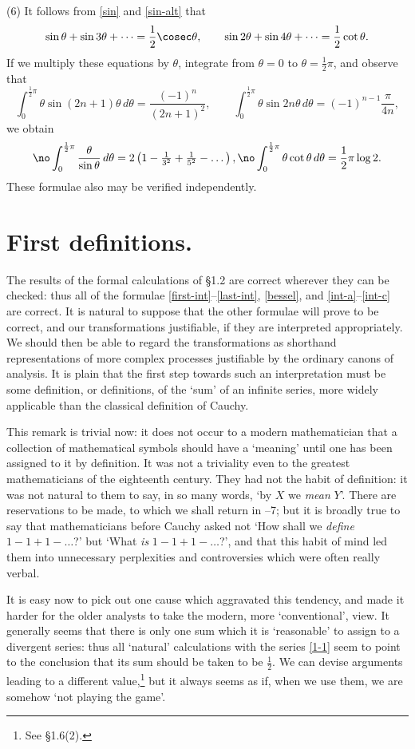 (6) It follows from \eqref{sin} and \eqref{sin-alt} that
$$\sin\theta+\sin3\theta+\dots = \frac12\cosec\theta, \qquad \sin2\theta+\sin4\theta+\dots = \frac12\cot\theta.$$
If we multiply these equations by $\theta$, integrate from $\theta=0$ to
$\theta=\frac12\pi$, and observe that
$$\int_0^{\frac12\pi} \theta\sin(2n+1)\theta\,d\theta = \frac{(-1)^n}{(2n+1)^2}, \qquad \int_0^{\frac12\pi} \theta\sin2n\theta\,d\theta = (-1)^{n-1}\frac{\pi}{4n},$$
we obtain
$$\no\label{int-b} \int_0^{\frac12\pi} \frac{\theta}{\sin\theta}\,d\theta = 2\left(1-\tfrac1{3^2}+\tfrac1{5^2}-\dots\right), \\
  \no\label{int-c} \int_0^{\frac12\pi} \theta\cot\theta\,d\theta = \frac12\pi\log2.$$
These formulae also may be verified independently.

\section{First definitions.} The results of the formal calculations of
\S1.2 are correct wherever they can be checked: thus all of the formulae
\eqref{first-int}--\eqref{last-int}, \eqref{bessel}, and
\eqref{int-a}--\eqref{int-c} are correct. It is natural to suppose that the
other formulae will prove to be correct, and our transformations
justifiable, if they are interpreted appropriately. We should then be able
to regard the transformations as shorthand representations of more complex
processes justifiable by the ordinary canons of analysis. It is plain that
the first step towards such an interpretation must be some definition, or
definitions, of the `sum' of an infinite series, more widely applicable than
the classical definition of Cauchy.

This remark is trivial now: it does not occur to a modern mathematician
that a collection of mathematical symbols should have a `meaning' until one
has been assigned to it by definition. It was not a triviality even to the
greatest mathematicians of the eighteenth century. They had not the habit of
definition: it was not natural to them to say, in so many words, `by $X$ we
\emph{mean} $Y$'. There are reservations to be made, to which we shall
return in --7; but it is broadly true to say that mathematicians
before Cauchy asked not `How shall we \emph{define} $1-1+1-\dots$?' but
`What \emph{is} $1-1+1-\dots$?', and that this habit of mind led them into
unnecessary perplexities and controversies which were often really verbal.

It is easy now to pick out one cause which aggravated this tendency, and
made it harder for the older analysts to take the modern, more
`conventional', view. It generally seems that there is only one sum which it
is `reasonable' to assign to a divergent series: thus all `natural'
calculations with the series \eqref{1-1} seem to point to the conclusion
that its sum should be taken to be $\frac12$. We can devise arguments
leading to a different value,\footnote{See \S1.6(2).} but it always seems
as if, when we use them, we are somehow `not playing the game'.

